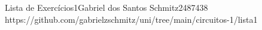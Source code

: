 \documentclass{article}
\begin{document}
{Lista de Exercícios}{1}{Gabriel dos Santos Schmitz}{2487438}
{https://github.com/gabrielzschmitz/uni/tree/main/circuitos-1/lista1}





\newpage
\printbibliography[title=Referências]
\end{document}
